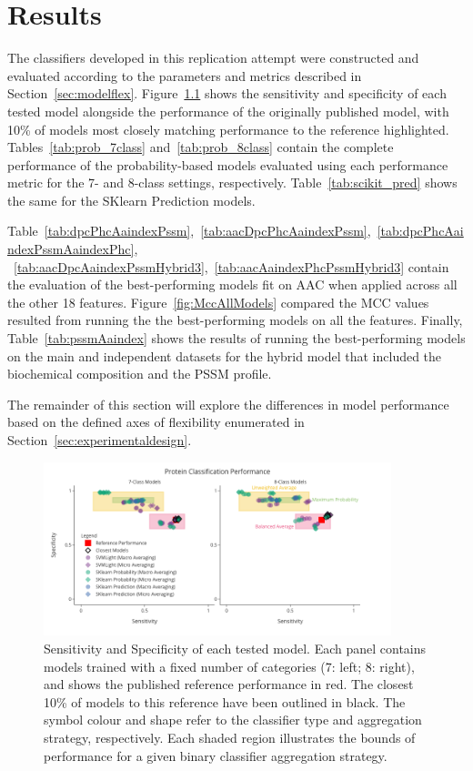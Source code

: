 \chapter{Results}

The classifiers developed in this replication attempt were constructed and evaluated according to the parameters
and metrics described in Section~\ref{sec:modelflex}. Figure~\ref{fig:modelPerformance} shows the sensitivity 
and specificity of each tested model alongside the performance of the originally published model, with 10\% of models
most closely matching performance to the reference highlighted.
Tables~\ref{tab:prob_7class} and~\ref{tab:prob_8class} contain the complete performance of the probability-based models
evaluated using each performance metric for the 7- and 8-class settings, respectively. Table~\ref{tab:scikit_pred}
shows the same for the SKlearn Prediction models.

Table~\ref{tab:dpcPhcAaindexPssm},~\ref{tab:aacDpcPhcAaindexPssm},~\ref{tab:dpcPhcAaindexPssmAaindexPhc},
~\ref{tab:aacDpcAaindexPssmHybrid3},~\ref{tab:aacAaindexPhcPssmHybrid3}
contain the evaluation of the best-performing models fit on AAC when 
applied across all the other 18 features. Figure~\ref{fig:MccAllModels} compared the MCC values resulted 
from running the the best-performing models on all the features. Finally, Table~\ref{tab:pssmAaindex} 
shows the results of running the best-performing models on the main and independent datasets for the 
hybrid model that included the biochemical composition and the PSSM profile.

The remainder of this section will explore the differences in model performance based on the defined axes of
flexibility enumerated in Section~\ref{sec:experimentaldesign}.

\begin{figure}[ht]
    \centering
    \includegraphics[width=0.90\textwidth]{figures/14ModelPerformance.png}
    \caption{Sensitivity and Specificity of each tested model. Each panel contains models 
    trained with a fixed number of categories (7: left; 8: right), and shows the published 
    reference performance in red. The closest 10\% of models to this reference have been 
    outlined in black. The symbol colour and shape refer to the classifier type and aggregation 
    strategy, respectively. Each shaded region illustrates the bounds of performance for a given 
    binary classifier aggregation strategy.}
    \label{fig:modelPerformance}
\end{figure}

